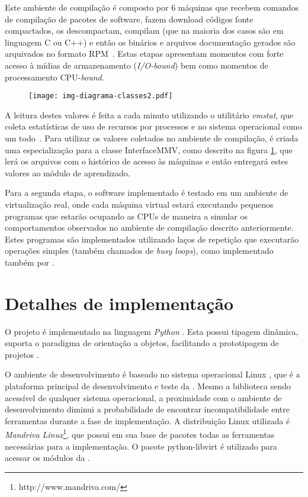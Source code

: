 Este ambiente de compilação é composto por $6$ máquinas que recebem
comandos de compilação de pacotes de software, fazem download códigos fonte
compactados, os descompactam, compilam (que na maioria dos casos são em
linguagem C ou C++) e então os binários e arquivos documentação gerados são
arquivados no formato RPM~\cite{ewing1996rpm}. Estas etapas apresentam
momentos com forte acesso à mídias de armazenamento (\emph{I/O-bound}) bem
como momentos de processamento CPU-\emph{bound}.

\begin{figure}[htp]
\centering
\texttt{[image: img-diagrama-classes2.pdf]}
\label{fig:diagramaclasses2}
\end{figure}

A leitura destes valores é feita a cada minuto utilizando o utilitário
\emph{vmstat}, que coleta estatísticas de uso de recursos por processos e no
sistema operacional como um todo~\cite{tanaka2005monitoring}. Para utilizar
os valores coletados no ambiente de compilação, é criada uma especialização
para a classe InterfaceMMV, como descrito na figura
\ref{fig:diagramaclasses2}, que lerá os arquivos com o histórico de acesso às
máquinas e então entregará estes valores ao módulo de aprendizado.

Para a segunda etapa, o software implementado é testado em um ambiente de
virtualização real, onde cada máquina virtual estará executando pequenos
programas que estarão ocupando as CPUs de maneira a simular os comportamentos
observados no ambiente de compilação descrito anteriormente.  Estes programas
são implementados utilizando laços de repetição que executarão operações
simples (também chamados de \emph{busy loops}), como implementado também por
.

\section{Detalhes de implementação}

O projeto é implementado na linguagem \emph{Python}
\cite{rossum1995python}.  Esta possui tipagem dinâmica, suporta o paradigma
de orientação a objetos, facilitando a prototipagem de projetos
\cite{lutz2006programming}.

O ambiente de desenvolvimento é baseado no sistema operacional Linux
\cite{morimoto2004entendendo}, que é a plataforma principal de
desenvolvimento e teste da \libvirt{}. Mesmo a biblioteca sendo acessível
de qualquer sistema operacional, a proximidade com o ambiente de
desenvolvimento diminui a probabilidade de encontrar incompatibilidade
entre ferramentas durante a fase de implementação. A distribuição Linux
utilizada é \emph{Mandriva Linux}\footnote{http://www.mandriva.com/},
que possui em sua base de pacotes todas as ferramentas necessárias para a
implementação. O pacote python-libvirt é utilizado para acessar
os módulos da \libvirt{}.


